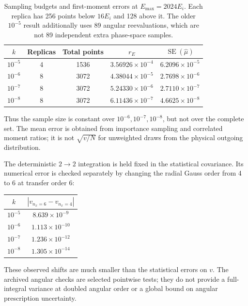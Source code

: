 \documentclass[10pt,a4paper]{article}
\newcommand{\SE}{\operatorname{SE}}
\begin{document}
\begin{table}[h!]
\centering\small
\caption{Sampling budgets and first-moment errors at $E_{\max}=2024E_i$.
Each replica has 256 points below $16E_i$ and 128 above it. The older
$10^{-5}$ result additionally uses 89 angular reevaluations, which are
not 89 independent extra phase-space samples.}
\begin{tabular}{ccccc}
\toprule
$k$ & Replicas & Total points & $r_E$ & $\SE(\widehat\mu)$\\
\midrule
$10^{-5}$ & 4 & 1536 & $3.56926\times10^{-4}$ & $6.2096\times10^{-5}$\\
$10^{-6}$ & 8 & 3072 & $4.38044\times10^{-5}$ & $2.7698\times10^{-6}$\\
$10^{-7}$ & 8 & 3072 & $5.24330\times10^{-6}$ & $2.7110\times10^{-7}$\\
$10^{-8}$ & 8 & 3072 & $6.11436\times10^{-7}$ & $4.6625\times10^{-8}$\\
\bottomrule
\end{tabular}
\end{table}

Thus the sample size is constant over $10^{-6},10^{-7},10^{-8}$, but
not over the complete set. The mean error is obtained from importance
sampling and correlated moment ratios; it is not $\sqrt{v/N}$ for
unweighted draws from the physical outgoing distribution.

The deterministic $2\to2$ integration is held fixed in the statistical
covariance. Its numerical error is checked separately by changing the
radial Gauss order from 4 to 6 at transfer order 6:
\begin{center}
\begin{tabular}{cc}
\toprule $k$ & $|v_{n_x=6}-v_{n_x=4}|$\\\midrule
$10^{-5}$ & $8.639\times10^{-9}$\\
$10^{-6}$ & $1.113\times10^{-10}$\\
$10^{-7}$ & $1.236\times10^{-12}$\\
$10^{-8}$ & $1.305\times10^{-14}$\\
\bottomrule
\end{tabular}
\end{center}
These observed shifts are much smaller than the statistical errors on
$v$. The archived angular checks are selected pointwise tests; they
do not provide a full-integral variance at doubled angular order or
a global bound on angular prescription uncertainty.

\clearpage
\end{document}
